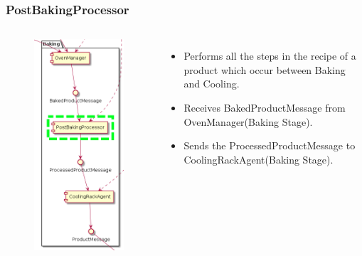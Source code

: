\documentclass{beamer}
\begin{document}
\begin{frame}
    \frametitle{\huge{PostBakingProcessor}}
    \begin{columns}[t]
        \begin{figure}[H]
            \centering
            \includegraphics[width=0.6\linewidth]{baking_PostBakingProcessor.png}
        \end{figure}
            \begin{itemize}
                \item Performs all the steps in the recipe of a product which occur between Baking and Cooling.
                \item Receives BakedProductMessage from OvenManager(Baking Stage).
                \item Sends the ProcessedProductMessage to CoolingRackAgent(Baking Stage).
            \end{itemize}
    \end{columns}
\end{frame}
\end{document}
